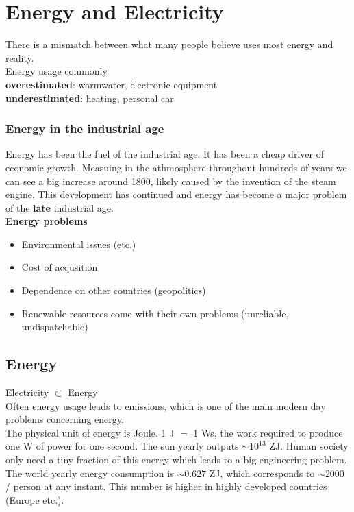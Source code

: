 \section{Energy and Electricity}
There is a mismatch between what many people believe uses most energy and reality.\\
Energy usage commonly\\
\textbf{overestimated}: warmwater, electronic equipment\\
\textbf{underestimated}: heating, personal car\\

\subsubsection{Energy in the industrial age}
Energy has been the fuel of the industrial age.
It has been a cheap driver of economic growth.
Measuing \cotwo in the athmosphere throughout hundreds of years we can see a big increase around 1800, likely caused by the invention of the steam engine. This development has continued and energy has become a major problem of the \textbf{late} industrial age.\\

\textbf{Energy problems}
\begin{itemize}
    \item Environmental issues (\cotwo etc.)
    \item Cost of acqusition
    \item Dependence on other countries (geopolitics)
    \item Renewable resources come with their own problems (unreliable, undispatchable)
\end{itemize}

\subsection{Energy}
Electricity $\subset$ Energy\\

Often energy usage leads to \cotwo emissions, which is one of the main modern day problems concerning energy.\\

The physical unit of energy is Joule. 1 J $=$ 1 Ws, the work required to produce one W of power for one second.
The sun yearly outputs $\sim 10^{13}$ ZJ.
Human society only need a tiny fraction of this energy which leads to a big engineering problem.
The world yearly energy consumption is $\sim 0.627$ ZJ, which corresponds to $\sim 2000$ / person at any instant.
This number is higher in highly developed countries (Europe etc.).\\

